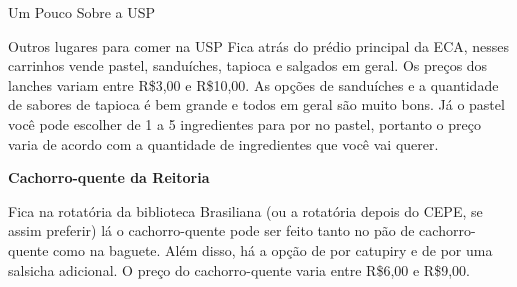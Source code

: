 \begin{secao}{Um Pouco Sobre a USP}
\begin{subsecao}{Outros lugares para comer na USP}
Fica atrás do prédio principal da ECA, nesses carrinhos vende pastel, sanduíches, tapioca e
salgados em geral. Os preços dos lanches variam entre R\$3,00 e R\$10,00. As opções de
sanduíches e a quantidade de sabores de tapioca é bem grande e todos em geral são muito bons.
Já o pastel você pode escolher de 1 a 5 ingredientes para por no pastel, portanto o preço
varia de acordo com a quantidade de ingredientes que você vai querer.

{\bf Cachorro-quente da Reitoria}

Fica na rotatória da biblioteca Brasiliana (ou a rotatória depois do CEPE, se assim preferir)
lá o cachorro-quente pode ser feito tanto no pão de cachorro-quente como na baguete. Além disso,
há a opção de por catupiry e de por uma salsicha adicional. O preço do cachorro-quente varia
entre R\$6,00 e R\$9,00.

\end{subsecao}

\end{secao}
